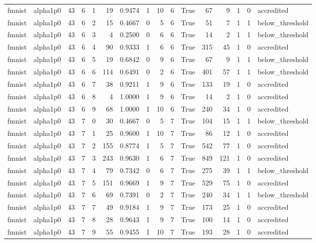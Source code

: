 \begin{tabular}{llrrrrrrrrrrrrrl}
fmnist & alpha1p0 & 43 & 6 & 1 & 19 & 0.9474 & 1 & 10 & 6 & True & 67 & 9 & 1 & 0 & accredited \\
fmnist & alpha1p0 & 43 & 6 & 2 & 15 & 0.4667 & 0 & 5 & 6 & True & 51 & 7 & 1 & 1 & below\_threshold \\
fmnist & alpha1p0 & 43 & 6 & 3 & 4 & 0.2500 & 0 & 6 & 6 & True & 14 & 2 & 1 & 1 & below\_threshold \\
fmnist & alpha1p0 & 43 & 6 & 4 & 90 & 0.9333 & 1 & 6 & 6 & True & 315 & 45 & 1 & 0 & accredited \\
fmnist & alpha1p0 & 43 & 6 & 5 & 19 & 0.6842 & 0 & 9 & 6 & True & 67 & 9 & 1 & 1 & below\_threshold \\
fmnist & alpha1p0 & 43 & 6 & 6 & 114 & 0.6491 & 0 & 2 & 6 & True & 401 & 57 & 1 & 1 & below\_threshold \\
fmnist & alpha1p0 & 43 & 6 & 7 & 38 & 0.9211 & 1 & 9 & 6 & True & 133 & 19 & 1 & 0 & accredited \\
fmnist & alpha1p0 & 43 & 6 & 8 & 4 & 1.0000 & 1 & 9 & 6 & True & 14 & 2 & 1 & 0 & accredited \\
fmnist & alpha1p0 & 43 & 6 & 9 & 68 & 1.0000 & 1 & 10 & 6 & True & 240 & 34 & 1 & 0 & accredited \\
fmnist & alpha1p0 & 43 & 7 & 0 & 30 & 0.4667 & 0 & 5 & 7 & True & 104 & 15 & 1 & 1 & below\_threshold \\
fmnist & alpha1p0 & 43 & 7 & 1 & 25 & 0.9600 & 1 & 10 & 7 & True & 86 & 12 & 1 & 0 & accredited \\
fmnist & alpha1p0 & 43 & 7 & 2 & 155 & 0.8774 & 1 & 5 & 7 & True & 542 & 77 & 1 & 0 & accredited \\
fmnist & alpha1p0 & 43 & 7 & 3 & 243 & 0.9630 & 1 & 6 & 7 & True & 849 & 121 & 1 & 0 & accredited \\
fmnist & alpha1p0 & 43 & 7 & 4 & 79 & 0.7342 & 0 & 6 & 7 & True & 275 & 39 & 1 & 1 & below\_threshold \\
fmnist & alpha1p0 & 43 & 7 & 5 & 151 & 0.9669 & 1 & 9 & 7 & True & 529 & 75 & 1 & 0 & accredited \\
fmnist & alpha1p0 & 43 & 7 & 6 & 69 & 0.7391 & 0 & 2 & 7 & True & 240 & 34 & 1 & 1 & below\_threshold \\
fmnist & alpha1p0 & 43 & 7 & 7 & 49 & 0.9184 & 1 & 9 & 7 & True & 173 & 25 & 1 & 0 & accredited \\
fmnist & alpha1p0 & 43 & 7 & 8 & 28 & 0.9643 & 1 & 9 & 7 & True & 100 & 14 & 1 & 0 & accredited \\
fmnist & alpha1p0 & 43 & 7 & 9 & 55 & 0.9455 & 1 & 10 & 7 & True & 193 & 28 & 1 & 0 & accredited \\

\end{tabular}
